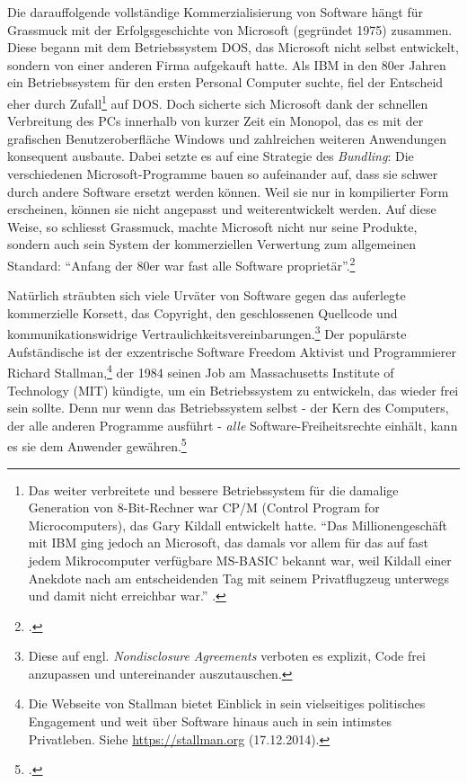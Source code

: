 \documentclass[
paper=164mm:234mm, %
pagesize, %
DIV=calc, %
10pt, %
BCOR=0mm, %
parskip=half- %
]{scrbook}
\begin{document}
Die darauffolgende vollständige Kommerzialisierung von Software hängt für Grassmuck mit der Erfolgsgeschichte von Microsoft (gegründet 1975) zusammen. Diese begann mit dem Betriebssystem DOS, das Microsoft nicht selbst entwickelt, sondern von einer anderen Firma aufgekauft hatte. Als IBM in den 80er Jahren ein Betriebssystem für den ersten Personal Computer suchte, fiel der Entscheid eher durch Zufall\footnote{Das weiter verbreitete und bessere Betriebssystem für die damalige Generation von 8-Bit-Rechner war CP/M (Control Program for Microcomputers), das Gary Kildall entwickelt hatte. \enquote{Das Millionengeschäft mit IBM ging jedoch an Microsoft, das damals vor allem für das auf fast jedem Mikrocomputer verfügbare MS-BASIC bekannt war, weil Kildall einer Anekdote nach am entscheidenden Tag mit seinem Privatflugzeug unterwegs und damit nicht erreichbar war.} \cite[205]{Grassmuck:2004}.} auf DOS. Doch sicherte sich Microsoft dank der schnellen Verbreitung des PCs innerhalb von kurzer Zeit ein Monopol, das es mit der grafischen Benutzeroberfläche Windows und zahlreichen weiteren Anwendungen konsequent ausbaute. Dabei setzte es auf eine Strategie des \emph{Bundling}: Die verschiedenen Microsoft-Programme bauen so aufeinander auf, dass sie schwer durch andere Software ersetzt werden können. Weil sie nur in kompilierter Form erscheinen, können sie nicht angepasst und weiterentwickelt werden. Auf diese Weise, so schliesst Grassmuck, machte Microsoft nicht nur seine Produkte, sondern auch sein System der kommerziellen Verwertung zum allgemeinen Standard: \enquote{Anfang der 80er war fast alle Software proprietär}.\footnote{\cite[221]{Grassmuck:2004}.}

Natürlich sträubten sich viele Urväter von Software gegen das auferlegte kommerzielle Korsett, das Copyright, den geschlossenen Quellcode und kommunikationswidrige Vertraulichkeitsvereinbarungen.\footnote{Diese auf engl. \emph{Nondisclosure Agreements} verboten es explizit, Code frei anzupassen und untereinander auszutauschen.} Der populärste Aufständische ist der exzentrische Software Freedom Aktivist und Programmierer Richard Stallman,\footnote{Die Webseite von Stallman bietet Einblick in sein vielseitiges politisches Engagement und weit über Software hinaus auch in sein intimstes Privatleben. Siehe \url{https://stallman.org} (17.12.2014).} der 1984 seinen Job am Massachusetts Institute of Technology (MIT) kündigte, um ein Betriebssystem zu entwickeln, das wieder frei sein sollte. Denn nur wenn das Betriebssystem selbst - der Kern des Computers, der alle anderen Programme ausführt - \emph{alle} Software-Freiheitsrechte einhält, kann es sie dem Anwender gewähren.\footnote{\cite[9]{Stallman:2010}.}
\end{document}
